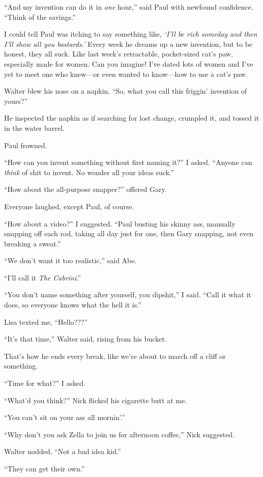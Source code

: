 ``And my invention can do it in \emph{one} hour,'' said Paul with
newfound confidence. ``Think of the savings.''

I could tell Paul was itching to say something like, \emph{`I'll be rich
someday and then I'll show all you bastards.'} Every week he dreams up a
new invention, but to be honest, they all suck. Like last week's
retractable, pocket-sized cat's paw, especially made for women. Can you
imagine! I've dated lots of women and I've yet to meet one who knew---or
even wanted to know---how to use a cat's paw.

Walter blew his nose on a napkin. ``So, what you call this friggin'
invention of yours?''

He inspected the napkin as if searching for lost change, crumpled it,
and tossed it in the water barrel.

Paul frowned.

``How can you invent something without first naming it?'' I asked.
``Anyone can \emph{think} of shit to invent. No wonder all your ideas
suck.''

``How about the all-purpose snapper?'' offered Gary.

Everyone laughed, except Paul, of course.

``How about a video?'' I suggested. ``Paul busting his skinny ass,
manually snapping off each rod, taking all day just for one, then Gary
snapping, not even breaking a sweat.''

``We don't want it too realistic,'' said Abe.

``I'll call it \emph{The Cabrini}.''

``You don't name something after yourself, you dipshit,'' I said. ``Call
it what it does, so everyone knows what the hell it is.''

Lisa texted me, ``Hello???''

``It's that time,'' Walter said, rising from his bucket.

That's how he ends every break, like we're about to march off a cliff or
something.

``Time for what?'' I asked.

``What'd you think?'' Nick flicked his cigarette butt at me.

``You can't sit on your ass all mornin'.''

``Why don't you ask Zella to join us for afternoon coffee,'' Nick
suggested.

Walter nodded. ``Not a bad idea kid.''

``They can get their own.''

